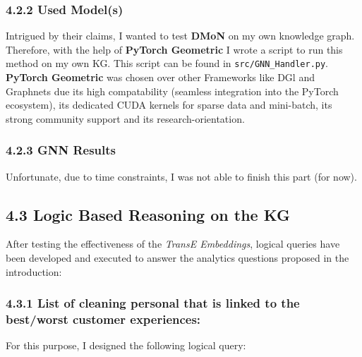 \subsubsection{4.2.2 Used Model(s)}\label{used-models-1}

Intrigued by their claims, I wanted to test \textbf{DMoN} on my own
knowledge graph. Therefore, with the help of \textbf{PyTorch Geometric}
I wrote a script to run this method on my own KG. This script can be
found in \texttt{src/GNN\_Handler.py}. \textbf{PyTorch Geometric} was
chosen over other Frameworks like DGl and Graphnets due its high
compatability (seamless integration into the PyTorch ecosystem), its
dedicated CUDA kernels for sparse data and mini-batch, its strong
community support and its research-orientation.

\subsubsection{4.2.3 GNN Results}\label{gnn-results}

Unfortunate, due to time constraints, I was not able to finish this part
(for now).

\subsection{4.3 Logic Based Reasoning on the
KG}\label{logic-based-reasoning-on-the-kg}

After testing the effectiveness of the \emph{TransE Embeddings}, logical
queries have been developed and executed to answer the analytics
questions proposed in the introduction:

\subsubsection{4.3.1 List of cleaning personal that is linked to the
best/worst customer
experiences:}\label{list-of-cleaning-personal-that-is-linked-to-the-bestworst-customer-experiences}

For this purpose, I designed the following logical query:


